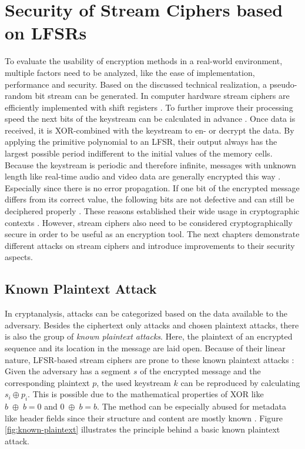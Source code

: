\section{Security of Stream Ciphers based on LFSRs}

To evaluate the usability of encryption methods in a real-world environment, multiple factors need to be analyzed, like the ease of implementation, performance and security. Based on the discussed technical realization, a pseudo-random bit stream can be generated. In computer hardware stream ciphers are efficiently implemented with shift registers \cite{Stamp.2007}. To further improve their processing speed the next bits of the keystream can be calculated in advance \cite[p. 3]{Robshaw.1995}. Once data is received, it is XOR-combined with the keystream to en- or decrypt the data. By applying the primitive polynomial to an LFSR, their output always has the largest possible period indifferent to the initial values of the memory cells. Because the keystream is periodic and therefore infinite, messages with unknown length like real-time audio and video data are generally encrypted this way \cite[p. 181]{Smart.2016}. Especially since there is no error propagation. If one bit of the encrypted message differs from its correct value, the following bits are not defective and can still be deciphered properly \cite[p. 181]{Smart.2016}. These reasons established their wide usage in cryptographic contexts \cite[p. 97]{Pommerening.2000}. However, stream ciphers also need to be considered cryptographically secure in order to be useful as an encryption tool. The next chapters demonstrate different attacks on stream ciphers and introduce improvements to their security aspects.


\subsection{Known Plaintext Attack}

In cryptanalysis, attacks can be categorized based on the data available to the adversary. Besides the ciphertext only attacks and chosen plaintext attacks, there is also the group of \emph{known plaintext attacks}. Here, the plaintext of an encrypted sequence and its location in the message are laid open. \cite[p. 2-3]{Stamp.2007} Because of their linear nature, LFSR-based stream ciphers are prone to these known plaintext attacks \cite[p. 233]{Smart.2016}: Given the adversary has a segment $s$ of the encrypted message and the corresponding plaintext $p$, the used keystream $k$ can be reproduced by calculating $s_i \oplus p_i$. This is possible due to the mathematical properties of XOR like $b\;\oplus\;b = 0$ \space and \space $0\;\oplus\;b = b$. The method can be especially abused for metadata like header fields since their structure and content are mostly known \cite[p. 359]{Eckert.2018}. Figure \ref{fig:known-plaintext} illustrates the principle behind a basic known plaintext attack. \\

